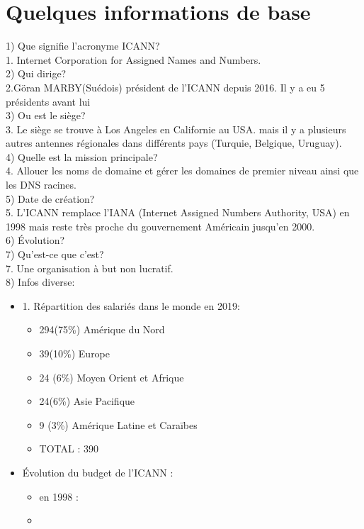 \documentclass{article}
\begin{document}

\section{Quelques informations de base}
1) Que signifie l'acronyme ICANN?\\
1. Internet Corporation for Assigned Names and Numbers.\\

2) Qui dirige?\\
2.Göran MARBY(Suédois) président de l'ICANN depuis 2016. Il y a eu 5 présidents avant lui\\

3) Ou est le siège?\\
3. Le siège se trouve à Los Angeles en Californie au USA. mais il y a plusieurs autres antennes régionales dans différents pays (Turquie, Belgique, Uruguay).\\

4) Quelle est la mission principale?\\
4. Allouer les noms de domaine et gérer les domaines de premier niveau ainsi que les DNS racines.\\

5) Date de création?\\
5. L'ICANN remplace l'IANA (Internet Assigned Numbers Authority, USA) en 1998 mais reste très proche du gouvernement Américain jusqu'en 2000.\\
 
6) Évolution?\\


7) Qu'est-ce que c'est?\\
7. Une organisation à but non lucratif.\\


8) Infos diverse:
\begin{itemize}
	\item 1. Répartition des salariés dans le monde en 2019:
	\begin{itemize}
		\item 294(75\%) Amérique du Nord
		\item 39(10\%) Europe
		\item 24 (6\%) Moyen Orient et Afrique
		\item 24(6\%) Asie Pacifique
		\item 9 (3\%) Amérique Latine et Caraïbes
		\item TOTAL : 390\\
	\end{itemize}
	\item Évolution du budget de l'ICANN :\\
	\begin{itemize}
		\item en 1998 :
		\item 
	\end{itemize}
\end{itemize}
\end{document}
